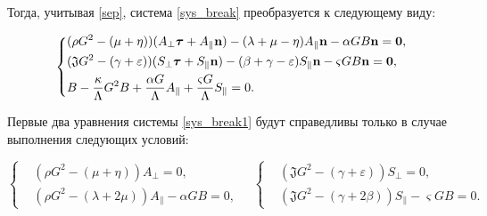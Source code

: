Тогда, учитывая \eqref{sep}, система \eqref{sys_break} преобразуется к следующему виду:

\begin{equation}\label{sys_break1}

\left\{

\begin{aligned}

&(\rho G^2- (\mu+ \eta)) ({A_{\perp} {\boldsymbol \tau} + A_\parallel {\bf n} })-(\lambda + \mu - \eta ) A_\parallel {\bf n}-\alpha G B {\bf n} =\bf{ 0},\\

&({\mathfrak J} G^2- (\gamma+ \varepsilon)) ({S_{\perp} {\boldsymbol \tau} + S_\parallel {\bf n} })-(\beta + \gamma - \varepsilon ) S_{\parallel} {\bf n}-\varsigma G B {\bf n}=\bf{ 0}, \\

 &B- \dfrac{\kappa}{\Lambda}G^2 B +  \dfrac{\alpha G}{\Lambda}A_\parallel + \dfrac{\varsigma G}{\Lambda} S_{\parallel}=0.

\end{aligned}

\right.

\end{equation}

Первые два уравнения системы \eqref{sys_break1} будут справедливы только в случае выполнения следующих условий:

\begin{equation}\label{linin}

\left\{

\begin{aligned}

&(\rho G^2- (\mu+ \eta)) A_{\perp} = 0,\\

&(\rho G^2 - (\lambda + 2\mu) ) A_\parallel -\alpha G B= 0,

\end{aligned} \right. \quad

\left\{

\begin{aligned}

&({\mathfrak J} G^2- (\gamma+ \varepsilon)) S_{\perp} =0,\\

&({\mathfrak J} G^2 - (\gamma + 2 \beta) ) S_{\parallel} -\varsigma G B= 0.

\end{aligned} \right.

\end{equation}



